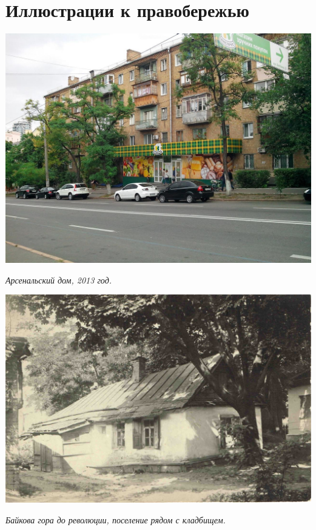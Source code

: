 \chapter*{Иллюстрации к правобережью}


\begin{center}
\includegraphics[width=\linewidth]{rpix/IMG_20130826_173208.jpg}

\textit{Арсенальский дом, 2013 год.}
\end{center}

\newpage

\vspace*{\fill}
\begin{center}
\includegraphics[width=\linewidth]{rpix/bayk.jpg}

\textit{Байкова гора до революции, поселение рядом с кладбищем.}
\end{center}
\vspace*{\fill}
\newpage



